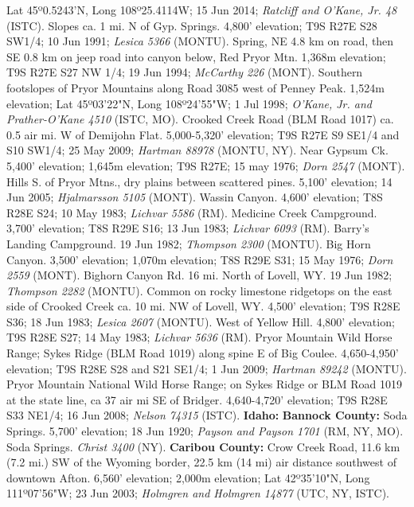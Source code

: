 Lat 45º0.5243'N, Long 108º25.4114W; 15 Jun 2014;
\textit{Ratcliff and O'Kane, Jr. 48} (ISTC).
Slopes ca. 1 mi. N of Gyp. Springs. 4,800' elevation; T9S R27E S28 SW1/4;
10 Jun 1991; \textit{Lesica 5366} (MONTU).
Spring, NE 4.8 km on road, then SE 0.8 km on jeep road into canyon
below, Red Pryor Mtn. 1,368m elevation; T9S R27E S27 NW 1/4; 19 Jun 1994;
\textit{McCarthy 226} (MONT).
Southern footslopes of Pryor Mountains along Road 3085 west of Penney Peak.
1,524m elevation; Lat 45º03'22"N, Long 108º24'55"W; 1 Jul 1998;
\textit{O'Kane, Jr. and Prather-O'Kane 4510} (ISTC, MO).
Crooked Creek Road (BLM Road 1017) ca. 0.5 air mi. W of Demijohn Flat.
5,000-5,320' elevation; T9S R27E S9 SE1/4 and S10 SW1/4; 25 May 2009;
\textit{Hartman 88978} (MONTU, NY).
Near Gypsum Ck. 5,400' elevation; 1,645m elevation; T9S R27E; 15 may 1976;
\textit{Dorn 2547} (MONT).
Hills S. of Pryor Mtns., dry plains between scattered pines. 5,100' elevation;
14 Jun 2005; \textit{Hjalmarsson 5105} (MONT).
Wassin Canyon. 4,600' elevation; T8S R28E S24; 10 May 1983;
\textit{Lichvar 5586} (RM).
Medicine Creek Campground. 3,700' elevation; T8S R29E S16; 13 Jun 1983;
\textit{Lichvar 6093} (RM).
Barry's Landing Campground. 19 Jun 1982; \textit{Thompson 2300} (MONTU).
Big Horn Canyon. 3,500' elevation; 1,070m elevation; T8S R29E S31; 15 May 1976;
\textit{Dorn 2559} (MONT).
Bighorn Canyon Rd. 16 mi. North of Lovell, WY. 19 Jun 1982;
\textit{Thompson 2282} (MONTU).
Common on rocky limestone ridgetops on the east side of Crooked Creek ca. 10 mi.
NW of Lovell, WY. 4,500' elevation; T9S R28E S36; 18 Jun 1983;
\textit{Lesica 2607} (MONTU).
West of Yellow Hill. 4,800' elevation; T9S R28E S27; 14 May 1983;
\textit{Lichvar 5636} (RM).
Pryor Mountain Wild Horse Range; Sykes Ridge (BLM Road 1019) along spine E of
Big Coulee. 4,650-4,950' elevation; T9S R28E S28 and S21 SE1/4; 1 Jun 2009;
\textit{Hartman 89242} (MONTU).
Pryor Mountain National Wild Horse Range; on Sykes Ridge or BLM Road 1019 at
the state line, ca 37 air mi SE of Bridger. 4,640-4,720' elevation;
T9S R28E S33 NE1/4; 16 Jun 2008; \textit{Nelson 74315} (ISTC).
  \textbf{Idaho:}
  \textbf{Bannock County:}
Soda Springs. 5,700' elevation; 18 Jun 1920;
\textit{Payson and Payson 1701} (RM, NY, MO).
Soda Springs. \textit{Christ 3400} (NY).
  \textbf{Caribou County:}
Crow Creek Road, 11.6 km (7.2 mi.) SW of the Wyoming border, 22.5 km (14 mi)
air distance southwest of downtown Afton. 6,560' elevation; 2,000m elevation;
Lat 42º35'10"N, Long 111º07'56"W; 23 Jun 2003;
\textit{Holmgren and Holmgren 14877} (UTC, NY, ISTC).
